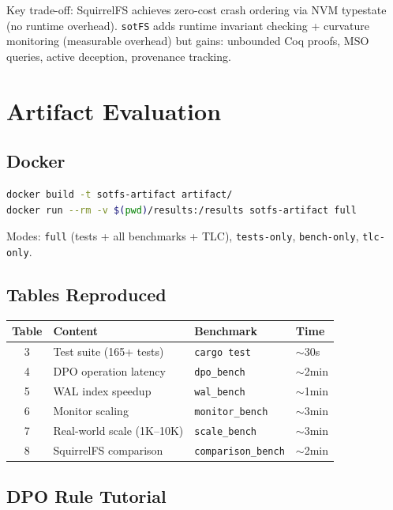 \documentclass[11pt,a4paper,twoside]{report}
\theoremstyle{definition}
\newcommand{\sotFS}{\texttt{sotFS}}
\begin{document}
Key trade-off: SquirrelFS achieves zero-cost crash ordering via NVM typestate
(no runtime overhead). \sotFS{} adds runtime invariant checking + curvature
monitoring (measurable overhead) but gains: unbounded Coq proofs, MSO queries,
active deception, provenance tracking.

\chapter{Artifact Evaluation}

\section{Docker}
\begin{lstlisting}[language=bash]
docker build -t sotfs-artifact artifact/
docker run --rm -v $(pwd)/results:/results sotfs-artifact full
\end{lstlisting}

Modes: \texttt{full} (tests + all benchmarks + TLC), \texttt{tests-only},
\texttt{bench-only}, \texttt{tlc-only}.

\section{Tables Reproduced}

\begin{center}\small
\begin{tabular}{clll}
\toprule
\textbf{Table} & \textbf{Content} & \textbf{Benchmark} & \textbf{Time} \\
\midrule
3 & Test suite (165+ tests)         & \texttt{cargo test}       & $\sim$30s \\
4 & DPO operation latency           & \texttt{dpo\_bench}       & $\sim$2min \\
5 & WAL index speedup               & \texttt{wal\_bench}       & $\sim$1min \\
6 & Monitor scaling                  & \texttt{monitor\_bench}   & $\sim$3min \\
7 & Real-world scale (1K--10K)      & \texttt{scale\_bench}     & $\sim$3min \\
8 & SquirrelFS comparison           & \texttt{comparison\_bench} & $\sim$2min \\
\bottomrule
\end{tabular}
\end{center}

\section{DPO Rule Tutorial}
\end{document}
